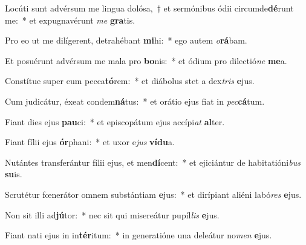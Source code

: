 \item Locúti sunt advérsum me lingua dolósa,~† et sermónibus ódii circumde\textbf{dé}runt me:~* et expugnavérunt \textit{me} \textbf{gra}tis.
\item Pro eo ut me dilígerent, detrahébant \textbf{mi}hi:~* ego autem \textit{o}\textbf{rá}bam.
\item Et posuérunt advérsum me mala pro \textbf{bo}nis:~* et ódium pro dilectió\textit{ne} \textbf{me}a.
\item Constítue super eum pecca\textbf{tó}rem:~* et diábolus stet a dex\textit{tris} \textbf{e}jus.
\item Cum judicátur, éxeat condem\textbf{ná}tus:~* et orátio ejus fiat in \textit{pec}\textbf{cá}tum.
\item Fiant dies ejus \textbf{pau}ci:~* et episcopátum ejus accípi\textit{at} \textbf{al}ter.
\item Fiant fílii ejus \textbf{ór}phani:~* et uxor e\textit{jus} \textbf{ví}\textbf{du}a.
\item Nutántes transferántur fílii ejus, et men\textbf{dí}cent:~* et ejiciántur de habitatióni\textit{bus} \textbf{su}is.
\item Scrutétur fœnerátor omnem substántiam \textbf{e}jus:~* et dirípiant aliéni labó\textit{res} \textbf{e}jus.
\item Non sit illi ad\textbf{jú}tor:~* nec sit qui misereátur pupíl\textit{lis} \textbf{e}jus.
\item Fiant nati ejus in in\textbf{tér}itum:~* in generatióne una deleátur no\textit{men} \textbf{e}jus.
